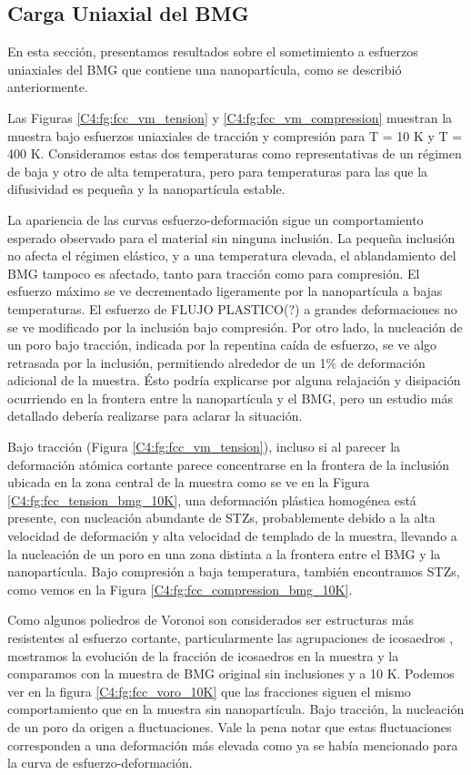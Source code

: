 \subsection{Carga Uniaxial del BMG}
\label{S4_3_2}

En esta sección, presentamos resultados sobre el sometimiento a esfuerzos uniaxiales del BMG que contiene una nanopartícula, como se describió anteriormente.

Las Figuras \ref{C4:fg:fcc_vm_tension} y \ref{C4:fg:fcc_vm_compression} muestran la muestra bajo esfuerzos uniaxiales de tracción y compresión para T = 10 K y T = 400 K. Consideramos estas dos temperaturas como representativas de un régimen de baja y otro de alta temperatura, pero para temperaturas para las que la difusividad es pequeña y la nanopartícula estable.

La apariencia de las curvas esfuerzo-deformación sigue un comportamiento esperado observado para el material sin ninguna inclusión. La pequeña inclusión no afecta el régimen elástico, y a una temperatura elevada, el ablandamiento del BMG tampoco es afectado, tanto para tracción como para compresión. El esfuerzo máximo se ve decrementado ligeramente por la nanopartícula a bajas temperaturas. El esfuerzo de FLUJO PLASTICO(?) a grandes deformaciones no se ve modificado por la inclusión bajo compresión. Por otro lado, la nucleación de un poro bajo tracción, indicada por la repentina caída de esfuerzo, se ve algo retrasada por la inclusión, permitiendo alrededor de un 1\% de deformación adicional de la muestra. Ésto podría explicarse por alguna relajación y disipación ocurriendo en la frontera entre la nanopartícula y el BMG, pero un estudio más detallado debería realizarse para aclarar la situación.

Bajo tracción (Figura \ref{C4:fg:fcc_vm_tension}), incluso si al parecer la deformación atómica cortante parece concentrarse en la frontera de la inclusión ubicada en la zona central de la muestra como se ve en la Figura \ref{C4:fg:fcc_tension_bmg_10K}, una deformación plástica homogénea está presente, con nucleación abundante de STZs, probablemente debido a la alta velocidad de deformación y alta velocidad de templado de la muestra, llevando a la nucleación de un poro en una zona distinta a la frontera entre el BMG y la nanopartícula. Bajo compresión a baja temperatura, también encontramos STZs, como vemos en la Figura \ref{C4:fg:fcc_compression_bmg_10K}.

Como algunos poliedros de Voronoi son considerados ser estructuras más resistentes al esfuerzo cortante, particularmente las agrupaciones de icosaedros \cite{cheng08}, mostramos la evolución de la fracción de icosaedros en la muestra y la comparamos con la muestra de BMG original sin inclusiones y a 10 K. Podemos ver en la figura \ref{C4:fg:fcc_voro_10K} que las fracciones siguen el mismo comportamiento que en la muestra sin nanopartícula. Bajo tracción, la nucleación de un poro da origen a fluctuaciones. Vale la pena notar que estas fluctuaciones corresponden a una deformación más elevada como ya se había mencionado para la curva de esfuerzo-deformación.

